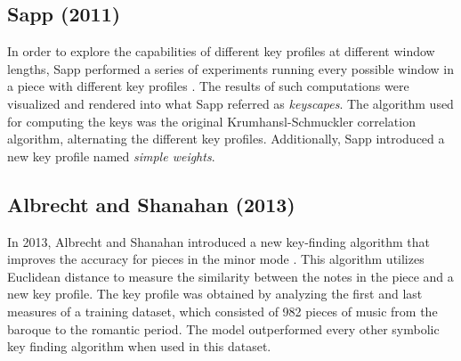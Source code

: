 

\subsection{Sapp (2011)}
In order to explore the capabilities of different key profiles at different window lengths, Sapp performed a series of experiments running every possible window in a piece with different key profiles \cite{sapp2011computational}. The results of such computations were visualized and rendered into what Sapp referred as \emph{keyscapes}. The algorithm used for computing the keys was the original Krumhansl-Schmuckler correlation algorithm, alternating the different key profiles. Additionally, Sapp introduced a new key profile named \emph{simple weights}. 

\subsection{Albrecht and Shanahan (2013)}
In 2013, Albrecht and Shanahan introduced a new key-finding algorithm that improves the accuracy for pieces in the minor mode \cite{albrecht2013use}. This algorithm utilizes Euclidean distance to measure the similarity between the notes in the piece and a new key profile. The key profile was obtained by analyzing the first and last measures of a training dataset, which consisted of 982 pieces of music from the baroque to the romantic period. The model outperformed every other symbolic key finding algorithm when used in this dataset.





